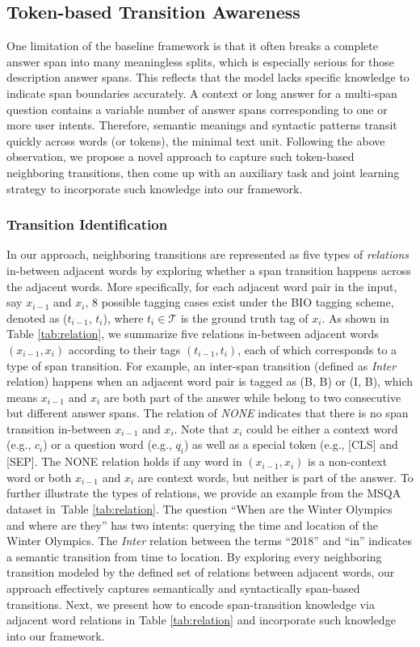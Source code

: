 \documentclass[a4paper]{cas-sc}
\newcommand{\1}[1]{\mathds{1}\left[#1\right]}
\newcommand{\tableref}[1]{Table \ref{#1}}
\begin{document}
\subsection{Token-based Transition Awareness}
\label{sec:aware}
One limitation of the baseline framework is that 
it often breaks a complete answer span into 
many meaningless splits, 
which is especially serious for those description answer spans.
This reflects that the model lacks specific knowledge to indicate span boundaries accurately. 
A context or long answer for a multi-span question contains a variable number of answer spans corresponding to one or more user intents. 
Therefore, semantic meanings and syntactic patterns transit quickly  
across words (or tokens), the minimal text unit.
Following the above observation, 
we propose a novel approach to capture such token-based neighboring transitions, 
then come up with an auxiliary task and  joint learning strategy to incorporate such knowledge into our framework.

\subsubsection{Transition Identification}
In our approach, neighboring transitions are represented as five types of \emph{relations} in-between adjacent words by exploring whether a span transition happens across the adjacent words. 
More specifically, for each adjacent word pair in the input, say $x_{i-1}$ and $x_{i}$, 
8 possible tagging cases exist under the BIO tagging scheme,
denoted as ($t_{i-1}$, $t_{i}$), where $t_{i}\in \mathcal{T}$ is the ground truth tag of $x_i$.
As shown in \tableref{tab:relation}, 
we summarize five relations in-between adjacent words $(x_{i-1}, x_{i})$ according to their tags $(t_{i-1}, t_{i})$, each of which corresponds to a type of span transition. 
For example, an inter-span transition (defined as \emph{Inter} relation) happens when an adjacent word pair is tagged as (B, B) or (I, B), which means $x_{i-1}$ and $x_{i}$ are both part of the answer while belong to two consecutive but different answer spans.
The relation of \emph{NONE} indicates that there is no span transition in-between $x_{i-1}$ and $x_{i}$.
Note that $x_{i}$ could be either a context word (e.g., $c_i$) or a question word (e.g., $q_i$) as well as a special token (e.g., [CLS] and [SEP].
The NONE relation holds if any word in $(x_{i-1}, x_{i})$ is a non-context word or both $x_{i-1}$ and $x_{i}$ are context words, but neither is part of the answer.
To further illustrate the types of relations, we provide an example from the MSQA dataset in~\tableref{tab:relation}. 
The question ``When are the Winter Olympics and where are they'' has two intents: querying the time and location of the Winter Olympics. The  \textit{Inter} relation between the terms ``2018'' and ``in'' indicates a semantic transition from time to location. By exploring every neighboring transition modeled by the defined set of relations between adjacent words, our approach effectively captures semantically and syntactically span-based transitions. 
Next, we present how to encode span-transition knowledge via adjacent word relations in \tableref{tab:relation} and incorporate such knowledge into our framework.
\end{document}
